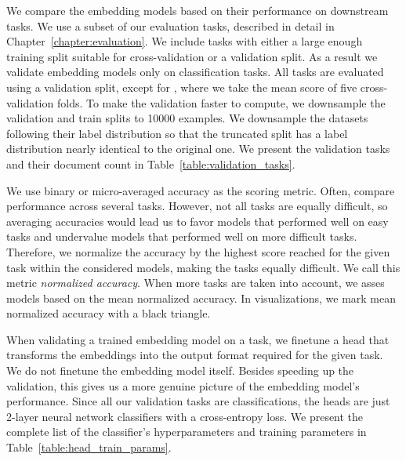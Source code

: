 We compare the embedding models based on their performance on downstream tasks.
We use a subset of our evaluation tasks, described in detail in
Chapter~\ref{chapter:evaluation}. We include tasks with either a large enough
training split suitable for cross-validation or a validation split. As a result
we validate embedding models only on classification tasks. All tasks are
evaluated using a validation split, except for , where we take the
mean score of five cross-validation folds. To make the validation faster to
compute, we downsample the validation and train splits to 10000 examples. We
downsample the datasets following their label distribution so that the
truncated split has a label distribution nearly identical to the original one.
We present the validation tasks and their document count in
Table~\ref{table:validation_tasks}.

We use binary or micro-averaged accuracy as the scoring metric. Often, compare
performance across several tasks. However, not all tasks are equally difficult,
so averaging accuracies would lead us to favor models that performed well on
easy tasks and undervalue models that performed well on more difficult tasks.
Therefore, we normalize the accuracy by the highest score reached for the given
task within the considered models, making the tasks equally difficult. We call
this metric \emph{normalized accuracy}. When more tasks are taken into account,
we asses models based on the mean normalized accuracy. In visualizations, we
mark mean normalized accuracy with a black triangle.

When validating a trained embedding model on a task, we finetune a head that
transforms the embeddings into the output format required for the given task. We
do not finetune the embedding model itself. Besides speeding up the validation,
this gives us a more genuine picture of the embedding model's performance.
Since all our validation tasks are classifications, the heads are just 2-layer
neural network classifiers with a cross-entropy loss. We present the complete
list of the classifier's hyperparameters and training parameters in
Table~\ref{table:head_train_params}.


